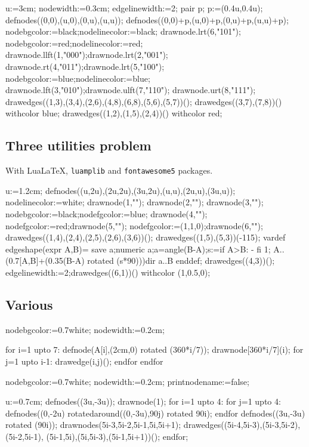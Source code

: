 \documentclass[11pt,a4paper,english]{article}
\begin{document}
\begin{exemple}[lefthand ratio = 0.65]
u:=3cm;
nodewidth:=0.3cm;
edgelinewidth:=2;
pair p; p:=(0.4u,0.4u);
defnodes((0,0),(u,0),(0,u),(u,u));
defnodes((0,0)+p,(u,0)+p,(0,u)+p,(u,u)+p);
nodebgcolor:=black;nodelinecolor:=black;
drawnode.lrt(6,"101");
nodebgcolor:=red;nodelinecolor:=red;
drawnode.llft(1,"000");drawnode.lrt(2,"001");
drawnode.rt(4,"011");drawnode.lrt(5,"100");
nodebgcolor:=blue;nodelinecolor:=blue;
drawnode.lft(3,"010");drawnode.ulft(7,"110");
drawnode.urt(8,"111");
drawedges((1,3),(3,4),(2,6),(4,8),(6,8),(5,6),(5,7))();
drawedges((3,7),(7,8))() withcolor blue;
drawedges((1,2),(1,5),(2,4))() withcolor red;
\end{exemple}

\subsection*{Three utilities problem}

With  Lua\LaTeX{}, \verb|luamplib| and \verb|fontawesome5| packages.

\begin{exemple}[lefthand ratio = 0.7]
u:=1.2cm;
defnodes((u,2u),(2u,2u),(3u,2u),(u,u),(2u,u),(3u,u));
nodelinecolor:=white;
drawnode(1,"\large \faHome");
drawnode(2,"\large \faHome");
drawnode(3,"\large \faHome");
nodebgcolor:=black;nodefgcolor:=blue;
drawnode(4,"\faWater");
nodefgcolor:=red;drawnode(5,"\faBurn");
nodefgcolor:=(1,1,0);drawnode(6,"\faBolt");
drawedges((1,4),(2,4),(2,5),(2,6),(3,6))();
drawedges((1,5),(5,3))(-115);
vardef edgeshape(expr A,B)=
save a;numeric a;a=angle(B-A);s:=if A>B: - fi 1;
A..(0.7[A,B]+(0.35(B-A) rotated (s*90))){dir a}..B
enddef;
drawedges((4,3))();
edgelinewidth:=2;drawedges((6,1))() withcolor (1,0.5,0);
\end{exemple}

\subsection*{Various}

\begin{exemple}[lefthand ratio = 0.6]
nodebgcolor:=0.7white;
nodewidth:=0.2cm;

for i=1 upto 7:
  defnode(A[i],(2cm,0) rotated (360*i/7));
  drawnode[360*i/7](i);
  for j=1 upto i-1:
    drawedge(i,j)();
  endfor
endfor
\end{exemple}

\begin{exemple}[lefthand ratio = 0.6]
nodebgcolor:=0.7white;
nodewidth:=0.2cm;
printnodename:=false;

u:=0.7cm;
defnodes((3u,-3u));
drawnode(1);
for i=1 upto 4:
 for j=1 upto 4:
  defnodes((0,-2u) rotatedaround((0,-3u),90j)
                      rotated 90i);
 endfor
 defnodes((3u,-3u) rotated (90i));
 drawnodes(5i-3,5i-2,5i-1,5i,5i+1);
 drawedges((5i-4,5i-3),(5i-3,5i-2),(5i-2,5i-1),
             (5i-1,5i),(5i,5i-3),(5i-1,5i+1))();
endfor;
\end{exemple}
\end{document}
